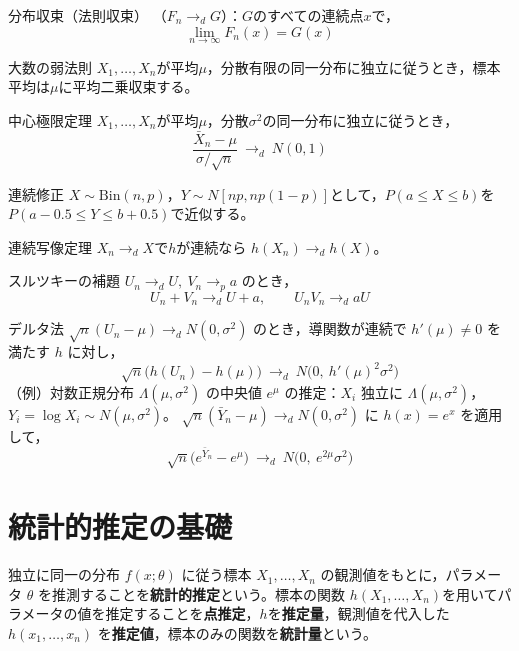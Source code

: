 \documentclass[a4paper,11pt]{ltjsarticle}
\begin{document}
\begin{term}{分布収束（法則収束）}
（$F_n\to_d G$）：$G$のすべての連続点$x$で，
\[
\lim_{n\to\infty} F_n(x) = G(x)
\]
\end{term}

\begin{term}{大数の弱法則}
$X_1,\dots,X_n$が平均$\mu$，分散有限の同一分布に独立に従うとき，標本平均は$\mu$に平均二乗収束する。
\end{term}

\begin{term}{中心極限定理}
$X_1,\dots,X_n$が平均$\mu$，分散$\sigma^2$の同一分布に独立に従うとき，
\[
\frac{\bar X_n - \mu}{\sigma/\sqrt n} \ \to_d\ N(0,1)
\]
\end{term}

\begin{term}{連続修正}
$X\sim\mathrm{Bin}(n,p)$，$Y\sim N[np,np(1-p)]$として，$P(a\le X\le b)$を$P(a-0.5\le Y\le b+0.5)$で近似する。
\end{term}

\begin{term}{連続写像定理}
$X_n\to_d X$で$h$が連続なら $h(X_n)\to_d h(X)$。
\end{term}

\begin{term}{スルツキーの補題}
$U_n\to_d U,\ V_n\to_p a$ のとき，
\[
U_n+V_n \to_d U+a,\qquad U_nV_n \to_d aU
\]
\end{term}

\begin{term}{デルタ法}
$\sqrt n(U_n-\mu)\to_d N(0,\sigma^2)$ のとき，導関数が連続で $h'(\mu)\ne0$ を満たす $h$ に対し，
\[
\sqrt n\big(h(U_n)-h(\mu)\big) \ \to_d\ N\big(0,\ h'(\mu)^2\sigma^2\big)
\]
（例）対数正規分布 $\Lambda(\mu,\sigma^2)$ の中央値 $e^\mu$ の推定：$X_i$ 独立に $\Lambda(\mu,\sigma^2)$，$Y_i=\log X_i\sim N(\mu,\sigma^2)$。
$\sqrt n(\bar Y_n-\mu)\to_d N(0,\sigma^2)$ に $h(x)=e^x$ を適用して，
\[
\sqrt n\big(e^{\bar Y_n}-e^{\mu}\big) \ \to_d\ N\big(0,\ e^{2\mu}\sigma^2\big)
\]
\end{term}


\section{統計的推定の基礎}

独立に同一の分布 $f(x;\theta)$ に従う標本 $X_1,\dots,X_n$ の観測値をもとに，パラメータ $\theta$ を推測することを\textbf{統計的推定}という。標本の関数 $h(X_1,\dots,X_n)$を用いてパラメータの値を推定することを\textbf{点推定}，$h$を\textbf{推定量}，観測値を代入した $h(x_1,\dots,x_n)$ を\textbf{推定値}，標本のみの関数を\textbf{統計量}という。
\end{document}
